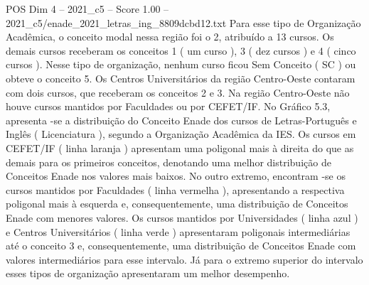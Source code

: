\begin{textsample}{POS Dim 4 – 2021\_c5 – Score 1.00 – 2021\_c5/enade\_2021\_letras\_ing\_8809dcbd12.txt}
Para esse tipo de Organização Acadêmica, o conceito modal nessa região foi o 2, atribuído a 13 cursos.
Os demais cursos receberam os conceitos 1 ( um curso ), 3 ( dez cursos ) e 4 ( cinco cursos ).
Nesse tipo de organização, nenhum curso ficou Sem Conceito ( SC ) ou obteve o conceito 5.
Os Centros Universitários da região Centro-Oeste contaram com dois cursos, que receberam os conceitos 2 e 3.
Na região Centro-Oeste não houve cursos mantidos por Faculdades ou por CEFET/IF.
No Gráfico 5.3, apresenta -se a distribuição do Conceito Enade dos cursos de Letras-Português e Inglês ( Licenciatura ), segundo a Organização Acadêmica da IES.
Os cursos em CEFET/IF ( linha laranja ) apresentam uma poligonal mais à direita do que as demais para os primeiros conceitos, denotando uma melhor distribuição de Conceitos Enade nos valores mais baixos.
No outro extremo, encontram -se os cursos mantidos por Faculdades ( linha vermelha ), apresentando a respectiva poligonal mais à esquerda e, consequentemente, uma distribuição de Conceitos Enade com menores valores.
Os cursos mantidos por Universidades ( linha azul ) e Centros Universitários ( linha verde ) apresentaram poligonais intermediárias até o conceito 3 e, consequentemente, uma distribuição de Conceitos Enade com valores intermediários para esse intervalo.
Já para o extremo superior do intervalo esses tipos de organização apresentaram um melhor desempenho.

\end{textsample}
